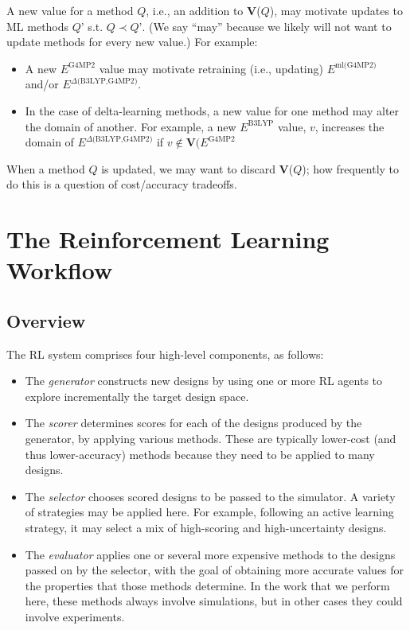 \documentclass[10pt]{article}
\begin{document}
A new value for a method $Q$, i.e., an addition to \textbf{V}($Q$), may motivate updates to ML methods $Q’$ s.t. $Q \prec Q’$. 
(We say ``may'' because we likely will not want to update methods for every new value.)
For example:
\begin{itemize}\itemsep-0.2em 
\item
A new $E^{\textrm{G4MP2}}$ value may motivate retraining (i.e., updating) $E^{\textrm{ml(G4MP2)}}$ and/or $E^{\textrm{$\Delta$(B3LYP,G4MP2)}}$.
\item
In the case of delta-learning methods, a new value for one method may alter the domain of another.
For example, a new $E^{\textrm{B3LYP}}$  value, $v$, increases the domain of $E^{\textrm{$\Delta$(B3LYP,G4MP2)}}$ if $v \notin \textbf{V}(E^{\textrm{G4MP2}}$
\end{itemize}

When a method $Q$ is updated, we may want to discard \textbf{V}($Q$);
how frequently to do this is a question of cost/accuracy tradeoffs.


\section{The Reinforcement Learning Workflow}




\subsection{Overview}

The RL system comprises four high-level components, as follows:

\begin{itemize}
\itemsep-0.2em 
\item
The \emph{generator} constructs new designs by using one or more RL agents to explore incrementally the target design space.

\item
The \emph{scorer} determines scores for each of the designs produced by the generator, by applying various methods.
These are typically lower-cost (and thus lower-accuracy) methods because they need to be applied to many designs.

\item
The \emph{selector} chooses scored designs to be passed to the simulator.
A variety of strategies may be applied here. For example, following an active learning strategy, it may select a mix of high-scoring and high-uncertainty designs.

\item
The \emph{evaluator} applies one or several more expensive methods to the designs passed on by the selector, with the goal of obtaining more accurate 
values for the properties that those methods determine. 
In the work that we perform here, these methods always involve simulations, but in other cases they could involve experiments.

\end{itemize}
\end{document}
